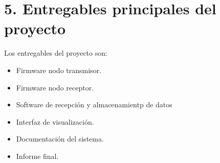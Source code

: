\documentclass[11pt]{charter}
\begin{document}
\section{5. Entregables principales del proyecto}
\label{sec:entregables}

Los entregables del proyecto son:
 
\begin{itemize}
\item Firmware nodo transmisor.
\item Firmware nodo receptor.
\item Software de recepción y almacenamientp de datos
\item Interfaz de visualización.
\item Documentación del sistema.
\item Informe final.

\end{itemize}

\newpage
\end{document}
